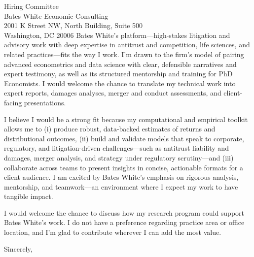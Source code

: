 \documentclass[11pt,letterpaper]{letter}
\begin{document}
\begin{letter}{Hiring Committee \\
Bates White Economic Consulting \\
2001 K Street NW, North Building, Suite 500 \\
Washington, DC 20006}
Bates White’s platform—high-stakes litigation and advisory work with deep expertise in antitrust and competition, life sciences, and related practices—fits the way I work. I’m drawn to the firm’s model of pairing advanced econometrics and data science with clear, defensible narratives and expert testimony, as well as its structured mentorship and training for PhD Economists. I would welcome the chance to translate my technical work into expert reports, damages analyses, merger and conduct assessments, and client-facing presentations.

I believe I would be a strong fit because my computational and empirical toolkit allows me to (i) produce robust, data-backed estimates of returns and distributional outcomes, (ii) build and validate models that speak to corporate, regulatory, and litigation-driven challenges—such as antitrust liability and damages, merger analysis, and strategy under regulatory scrutiny—and (iii) collaborate across teams to present insights in concise, actionable formats for a client audience. I am excited by Bates White’s emphasis on rigorous analysis, mentorship, and teamwork—an environment where I expect my work to have tangible impact.

I would welcome the chance to discuss how my research program could support Bates White’s work. I do not have a preference regarding practice area or office location, and I’m glad to contribute wherever I can add the most value.

\closing{Sincerely,}

\end{letter}
\end{document}

